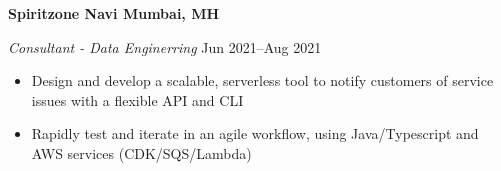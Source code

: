 \textbf{Spiritzone \hfill Navi Mumbai, MH}\par

\textit{Consultant - Data Enginerring} \hfill Jun 2021--Aug 2021
\begin{itemize}
	\item Design and develop a scalable, serverless tool to notify customers of service issues with a flexible API and CLI
	\item Rapidly test and iterate in an agile workflow, using Java/Typescript and AWS services (CDK/SQS/Lambda)
\end{itemize}\par